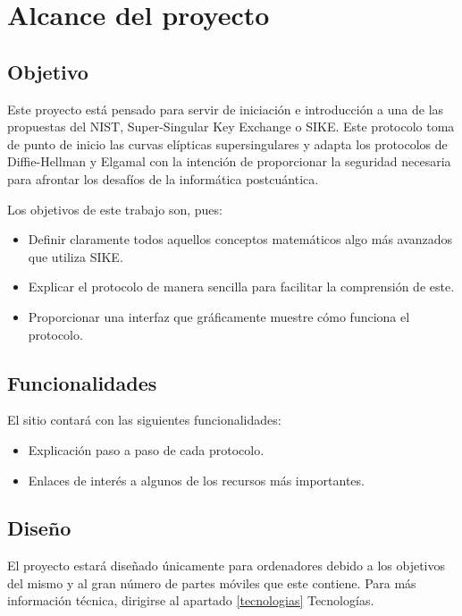 \chapter{Alcance del proyecto}\label{alcance}

\section{Objetivo}

Este proyecto está pensado para servir de iniciación e introducción a una de las propuestas del NIST, Super-Singular Key Exchange o SIKE. Este protocolo toma de punto de inicio las curvas elípticas supersingulares y adapta los protocolos de Diffie-Hellman y Elgamal con la intención de proporcionar la seguridad necesaria para afrontar los desafíos de la informática postcuántica.

Los objetivos de este trabajo son, pues:

\begin{itemize}
    \item Definir claramente todos aquellos conceptos matemáticos algo más avanzados que utiliza SIKE.
    \item Explicar el protocolo de manera sencilla para facilitar la comprensión de este.
    \item Proporcionar una interfaz que gráficamente muestre cómo funciona el protocolo.
\end{itemize}



\section{Funcionalidades}

El sitio contará con las siguientes funcionalidades:

\begin{itemize}
    \item Explicación paso a paso de cada protocolo.
    \item Enlaces de interés a algunos de los recursos más importantes.
\end{itemize}

\section{Diseño}

El proyecto estará diseñado únicamente para ordenadores debido a los objetivos del mismo y al gran número de partes móviles que este contiene. Para más información técnica, dirigirse al apartado \ref{tecnologias} Tecnologías.

